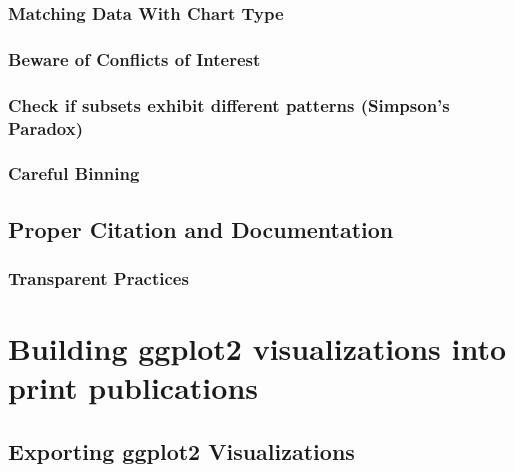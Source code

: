 \documentclass[
]{krantz}
\begin{document}
\hypertarget{matching-data-with-chart-type}{%
\subsection{Matching Data With Chart Type}\label{matching-data-with-chart-type}}

\hypertarget{beware-of-conflicts-of-interest}{%
\subsection{Beware of Conflicts of Interest}\label{beware-of-conflicts-of-interest}}

\hypertarget{check-if-subsets-exhibit-different-patterns-simpsons-paradox}{%
\subsection{Check if subsets exhibit different patterns (Simpson's Paradox)}\label{check-if-subsets-exhibit-different-patterns-simpsons-paradox}}

\hypertarget{careful-binning}{%
\subsection{Careful Binning}\label{careful-binning}}

\hypertarget{proper-citation-and-documentation}{%
\section{Proper Citation and Documentation}\label{proper-citation-and-documentation}}

\hypertarget{transparent-practices}{%
\subsection{Transparent Practices}\label{transparent-practices}}

\hypertarget{print-publications}{%
\chapter{Building ggplot2 visualizations into print publications}\label{print-publications}}

\hypertarget{exporting-ggplot2-visualizations}{%
\section{Exporting ggplot2 Visualizations}\label{exporting-ggplot2-visualizations}}
\end{document}
